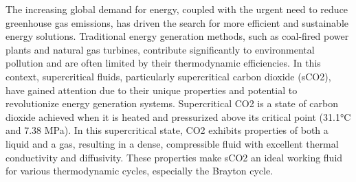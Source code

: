 
The increasing global demand for energy, coupled with the urgent need to reduce greenhouse gas emissions, has driven the search for more efficient and sustainable energy solutions. 
Traditional energy generation methods, such as coal-fired power plants and natural gas turbines, contribute significantly to environmental pollution and are often limited by their 
thermodynamic efficiencies. In this context, supercritical fluids, particularly supercritical carbon dioxide (sCO2), have gained attention due to their unique properties and 
potential to revolutionize energy generation systems.
Supercritical CO2 is a state of carbon dioxide achieved when it is heated and pressurized above its critical point (31.1°C and 7.38 MPa). 
In this supercritical state, CO2 exhibits properties of both a liquid and a gas, resulting in a dense, compressible fluid with excellent thermal conductivity and diffusivity. 
These properties make sCO2 an ideal working fluid for various thermodynamic cycles, especially the Brayton cycle.



